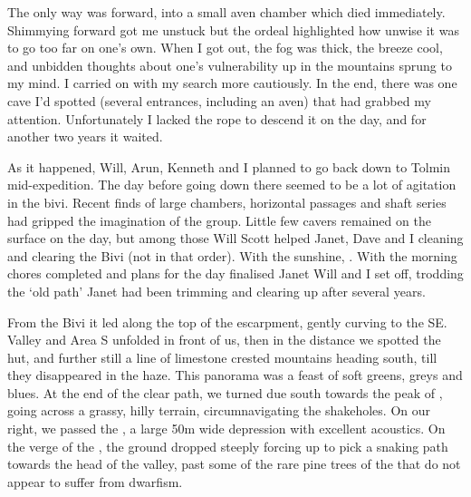 The only way was forward, into a small aven chamber which died immediately. Shimmying forward got me unstuck but the ordeal highlighted how unwise it was to go too far on one's own. When I got out, the fog was thick, the breeze cool, and unbidden thoughts about one's vulnerability up in the mountains sprung to my mind. I carried on with my search more cautiously. In the end, there was one cave I'd spotted (several entrances, including an aven) that had grabbed my attention. Unfortunately I lacked the rope to descend it on the day, and for another two years it waited.

As it happened, Will, Arun, Kenneth and I planned to go back down to Tolmin mid-expedition. The day before going down there seemed to be a lot of agitation in the bivi. Recent finds of large chambers, horizontal passages and shaft series had gripped the imagination of the group. Little few cavers remained on the surface on the day, but among those Will Scott helped Janet, Dave and I cleaning and clearing the Bivi (not in that order). With the sunshine, . With the morning chores completed and plans for the day finalised Janet Will and I set off, trodding the `old  path' Janet had been trimming and clearing up after several years. 

From the Bivi it led along the top of the  escarpment, gently curving to the SE.  Valley and Area S unfolded in front of us, then in the distance we spotted the  hut, and further still a line of limestone crested mountains heading south, till they disappeared in the haze. This panorama was a feast of soft greens, greys and blues. At the end of the clear path, we turned due south towards the peak of , going across a grassy, hilly terrain, circumnavigating the shakeholes. On our right, we passed the , a large 50m wide depression with excellent acoustics. On the verge of the , the ground dropped steeply forcing up to pick a snaking path towards the head of the valley, past some of the rare pine trees of the  that do not appear to suffer from dwarfism. 

